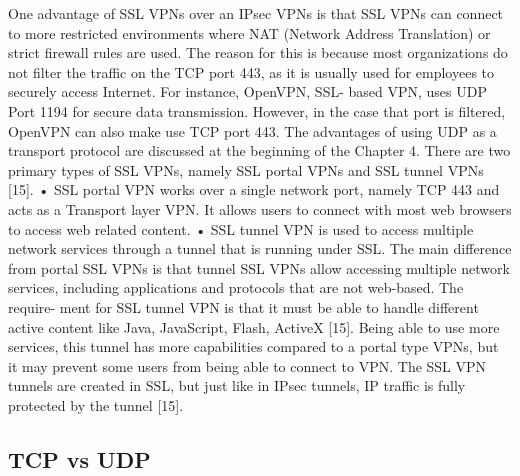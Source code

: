 One advantage of SSL VPNs over an IPsec VPNs is that SSL VPNs can connect to more restricted environments where NAT (Network Address Translation) or strict firewall rules are used. The reason for this is because most organizations do not filter the traffic on the TCP port 443, as it is usually used for employees to securely access Internet. For instance, OpenVPN, SSL- based VPN, uses UDP Port 1194 for secure data transmission. However, in the case that port is filtered, OpenVPN can also make use TCP port 443. The advantages of using UDP as a transport protocol are discussed at the beginning of the Chapter 4.
There are two primary types of SSL VPNs, namely SSL portal VPNs and SSL tunnel VPNs [15].
• SSL portal VPN works over a single network port, namely TCP 443 and acts as a Transport layer VPN. It allows users to connect with most web browsers to access web related content.
• SSL tunnel VPN is used to access multiple network services through a tunnel that is running under SSL. The main difference from portal SSL VPNs is that tunnel SSL VPNs allow accessing multiple network services, including applications and protocols that are not web-based. The require- ment for SSL tunnel VPN is that it must be able to handle different active content like Java, JavaScript, Flash, ActiveX [15]. Being able to use more services, this tunnel has more capabilities compared to a portal type VPNs, but it may prevent some users from being able to connect to VPN. The SSL VPN tunnels are created in SSL, but just like in IPsec tunnels, IP traffic is fully protected by the tunnel [15].

\subsection{TCP vs UDP}

